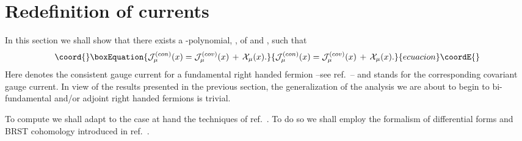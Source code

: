 \documentclass[a4paper,12pt]{article}
\def\cJ{{\cal J}}
\def\cX{{\cal X}}
\def\A{{\rm A}}
\def\F{{\rm F}}
\begin{document}
\section{Redefinition  of currents}

In this section we shall show that there exists a \myHighlight{$*$}\coordHE{}-polynomial, \myHighlight{$\cX^{\mu}$}\coordHE{}, 
of \myHighlight{$\A$}\coordHE{} and \myHighlight{$\F$}\coordHE{}, such that 
\begin{equation}\coord{}\boxEquation{
\cJ^{(con)}_{\mu}(x)=\cJ^{(cov)}_{\mu}(x)\,+\,\cX_{\mu}(x).
\label{redefinition}
}{
\cJ^{(con)}_{\mu}(x)=\cJ^{(cov)}_{\mu}(x)\,+\,\cX_{\mu}(x).
}{ecuacion}\coordE{}\end{equation}
Here \myHighlight{$\cJ^{(con)}_{\mu}(x)$}\coordHE{} denotes the consistent gauge current for a 
fundamental right handed fermion  
--see ref.~\cite{Gracia-Bondia:2000pz, Bonora:2000he, Grisaru:2001sk}-- and
\myHighlight{$\cJ^{(cov)}_{\mu}(x)$}\coordHE{} stands for the corresponding covariant gauge current. 
In view of the results presented in the previous section,  
the generalization of the analysis we are about to begin to  bi-fundamental and/or adjoint right handed fermions is trivial. 

  To compute \myHighlight{$\cX^{\mu}$}\coordHE{} we shall adapt to the 
case at hand the techniques of ref.~\cite{Alvarez-Gaume:1985dr}. To do so we 
shall employ the  formalism of differential forms and BRST cohomology 
introduced  in ref.~\cite{Bonora:2000he}. 
\end{document}
